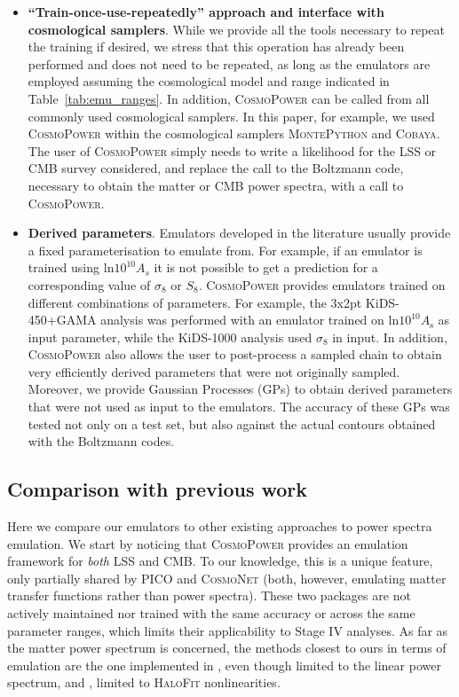 \documentclass[fleqn,usenatbib]{mnras}
\begin{document}
\begin{itemize}
\smallskip

\item \textbf{``Train-once-use-repeatedly'' approach and interface with cosmological samplers}. While we provide all the tools necessary to repeat the training if desired, we stress that this operation has already been performed and does not need to be repeated, as long as the emulators are employed assuming the cosmological model and range indicated in Table~\ref{tab:emu_ranges}. In addition, \textsc{CosmoPower} can be called from all commonly used cosmological samplers. In this paper, for example, we used \textsc{CosmoPower} within the cosmological samplers \textsc{MontePython} and \textsc{Cobaya}. The user of \textsc{CosmoPower} simply needs to write a likelihood for the LSS or CMB survey considered, and replace the call to the Boltzmann code, necessary to obtain the matter or CMB power spectra, with a call to \textsc{CosmoPower}.

\smallskip

\item \textbf{Derived parameters}. Emulators developed in the literature usually provide a fixed parameterisation to emulate from. For example, if an emulator is trained using $\mathrm{ln} 10^{10} A_s$ it is not possible to get a prediction for a corresponding value of $\sigma_8$ or $S_8$. \textsc{CosmoPower} provides emulators trained on different combinations of parameters. For example, the 3x2pt KiDS-450+GAMA analysis was performed with an emulator trained on $\mathrm{ln} 10^{10} A_{\textrm{s}}$ as input parameter, while the KiDS-1000 analysis used $\sigma_8$ in input. In addition, \textsc{CosmoPower} also allows the user to post-process a sampled chain to obtain very efficiently derived parameters that were not originally sampled. Moreover, we provide Gaussian Processes (GPs) to obtain derived parameters that were not used as input to the emulators. The accuracy of these GPs was tested not only on a test set, but also against the actual contours obtained with the Boltzmann codes.

\end{itemize}

\subsection{Comparison with previous work}
Here we compare our emulators to other existing approaches to power spectra emulation. We start by noticing that \textsc{CosmoPower} provides an emulation framework for \textit{both} LSS and CMB. To our knowledge, this is a unique feature, only partially shared by \textsc{PICO} and \textsc{CosmoNet} (both, however, emulating matter transfer functions rather than power spectra). These two packages are not actively maintained nor trained with the same accuracy or across the same parameter ranges, which limits their applicability to Stage IV analyses. As far as the matter power spectrum is concerned, the methods closest to ours in terms of emulation are the one implemented in \citet{Arico21}, even though limited to the linear power spectrum, and \citet{Agarwal12}, limited to \textsc{HaloFit} nonlinearities.  
\end{document}
